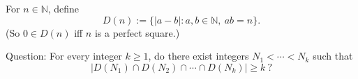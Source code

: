 For $n\in\mathbb N$, define
\[D(n):=\{ |a-b| : a,b\in\mathbb N,\ ab=n\}.
\]
(So $0\in D(n)$ iff $n$ is a perfect square.)

Question: For every integer $k\ge 1$, do there exist integers $N_1<\cdots<N_k$ such that
\[\big|D(N_1)\cap D(N_2)\cap\cdots\cap D(N_k)\big|\ge k\ ?\]
